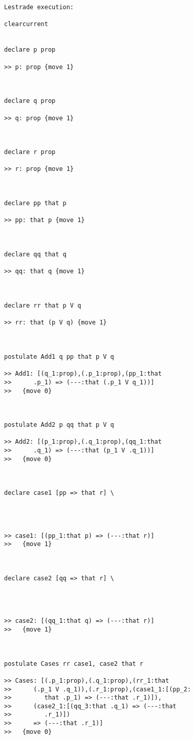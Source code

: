 \documentclass[12pt]{article}
\begin{document}
\begin{verbatim}Lestrade execution:

clearcurrent


declare p prop

>> p: prop {move 1}



declare q prop

>> q: prop {move 1}



declare r prop

>> r: prop {move 1}



declare pp that p

>> pp: that p {move 1}



declare qq that q

>> qq: that q {move 1}



declare rr that p V q

>> rr: that (p V q) {move 1}



postulate Add1 q pp that p V q

>> Add1: [(q_1:prop),(.p_1:prop),(pp_1:that
>>      .p_1) => (---:that (.p_1 V q_1))]
>>   {move 0}



postulate Add2 p qq that p V q

>> Add2: [(p_1:prop),(.q_1:prop),(qq_1:that
>>      .q_1) => (---:that (p_1 V .q_1))]
>>   {move 0}



declare case1 [pp => that r] \
   



>> case1: [(pp_1:that p) => (---:that r)]
>>   {move 1}



declare case2 [qq => that r] \
   



>> case2: [(qq_1:that q) => (---:that r)]
>>   {move 1}



postulate Cases rr case1, case2 that r

>> Cases: [(.p_1:prop),(.q_1:prop),(rr_1:that
>>      (.p_1 V .q_1)),(.r_1:prop),(case1_1:[(pp_2:
>>         that .p_1) => (---:that .r_1)]),
>>      (case2_1:[(qq_3:that .q_1) => (---:that
>>         .r_1)])
>>      => (---:that .r_1)]
>>   {move 0}


\end{verbatim}
\end{document}
